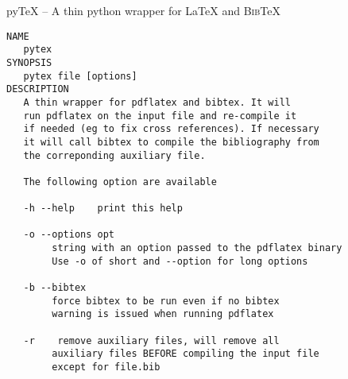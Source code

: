 \documentclass{article}
\begin{document}
py{\TeX} -- A thin python \cite{python} wrapper for {\LaTeX} and \textsc{Bib}\TeX

\begin{verbatim}
NAME
   pytex
SYNOPSIS
   pytex file [options]
DESCRIPTION
   A thin wrapper for pdflatex and bibtex. It will 
   run pdflatex on the input file and re-compile it 
   if needed (eg to fix cross references). If necessary
   it will call bibtex to compile the bibliography from 
   the correponding auxiliary file.

   The following option are available

   -h --help	print this help 

   -o --options	opt
        string with an option passed to the pdflatex binary
        Use -o of short and --option for long options 

   -b --bibtex	
        force bibtex to be run even if no bibtex 
        warning is issued when running pdflatex
   
   -r 	 remove auxiliary files, will remove all
        auxiliary files BEFORE compiling the input file
        except for file.bib
\end{verbatim}



\end{document}
